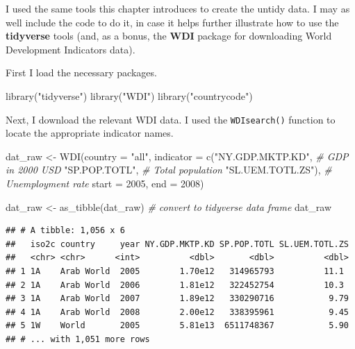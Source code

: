 \documentclass[
  12pt,
  oneside,openany]{book}
\newenvironment{Shaded}{\begin{snugshade}}{\end{snugshade}}
\newcommand{\AttributeTok}[1]{\textcolor[rgb]{0.77,0.63,0.00}{#1}}
\newcommand{\CommentTok}[1]{\textcolor[rgb]{0.56,0.35,0.01}{\textit{#1}}}
\newcommand{\DecValTok}[1]{\textcolor[rgb]{0.00,0.00,0.81}{#1}}
\newcommand{\FunctionTok}[1]{\textcolor[rgb]{0.00,0.00,0.00}{#1}}
\newcommand{\NormalTok}[1]{#1}
\newcommand{\OtherTok}[1]{\textcolor[rgb]{0.56,0.35,0.01}{#1}}
\newcommand{\StringTok}[1]{\textcolor[rgb]{0.31,0.60,0.02}{#1}}
\begin{document}
I used the same tools this chapter introduces to create the untidy data. I may as well include the code to do it, in case it helps further illustrate how to use the \textbf{tidyverse} tools (and, as a bonus, the \textbf{WDI} package for downloading World Development Indicators data).

First I load the necessary packages.

\begin{Shaded}
\begin{Highlighting}[]
\FunctionTok{library}\NormalTok{(}\StringTok{"tidyverse"}\NormalTok{)}
\FunctionTok{library}\NormalTok{(}\StringTok{"WDI"}\NormalTok{)}
\FunctionTok{library}\NormalTok{(}\StringTok{"countrycode"}\NormalTok{)}
\end{Highlighting}
\end{Shaded}

Next, I download the relevant WDI data. I used the \texttt{WDIsearch()} function to locate the appropriate indicator names.

\begin{Shaded}
\begin{Highlighting}[]
\NormalTok{dat\_raw }\OtherTok{\textless{}{-}} \FunctionTok{WDI}\NormalTok{(}\AttributeTok{country =} \StringTok{"all"}\NormalTok{,}
               \AttributeTok{indicator =} \FunctionTok{c}\NormalTok{(}\StringTok{"NY.GDP.MKTP.KD"}\NormalTok{,  }\CommentTok{\# GDP in 2000 USD}
                             \StringTok{"SP.POP.TOTL"}\NormalTok{,     }\CommentTok{\# Total population}
                             \StringTok{"SL.UEM.TOTL.ZS"}\NormalTok{), }\CommentTok{\# Unemployment rate}
               \AttributeTok{start =} \DecValTok{2005}\NormalTok{,}
               \AttributeTok{end =} \DecValTok{2008}\NormalTok{)}

\NormalTok{dat\_raw }\OtherTok{\textless{}{-}} \FunctionTok{as\_tibble}\NormalTok{(dat\_raw)  }\CommentTok{\# convert to tidyverse data frame}
\NormalTok{dat\_raw}
\end{Highlighting}
\end{Shaded}

\begin{verbatim}
## # A tibble: 1,056 x 6
##   iso2c country     year NY.GDP.MKTP.KD SP.POP.TOTL SL.UEM.TOTL.ZS
##   <chr> <chr>      <int>          <dbl>       <dbl>          <dbl>
## 1 1A    Arab World  2005        1.70e12   314965793          11.1 
## 2 1A    Arab World  2006        1.81e12   322452754          10.3 
## 3 1A    Arab World  2007        1.89e12   330290716           9.79
## 4 1A    Arab World  2008        2.00e12   338395961           9.45
## 5 1W    World       2005        5.81e13  6511748367           5.90
## # ... with 1,051 more rows
\end{verbatim}
\end{document}
